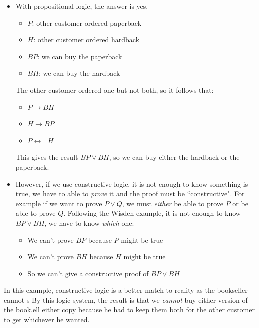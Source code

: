 \documentclass{article}
\begin{document}
\begin{enumerate}
\begin{figure}[H]
\end{figure}
\begin{itemize}
\item With propositional logic, the answer is yes.
\begin{itemize}
\item $P$: other customer ordered paperback
\item $H$: other customer ordered hardback
\item $BP$: we can buy the paperback
\item $BH$: we can buy the hardback
\end{itemize}
The other customer ordered one but not both, so it follows that:
\begin{itemize}
\item $P \rightarrow BH$
\item $H \rightarrow BP$
\item $P \leftrightarrow \neg H$
\end{itemize}
This gives the result $BP \vee BH$, so we can buy either the hardback or the paperback.
\item However, if we use constructive logic, it is not enough to know something is true, we have to able to \textit{prove} it and the proof must be ``constructive". For example if we want to prove $P \vee Q$, we must \textit{either} be able to prove $P$ or be able to prove $Q$. Following the Wisden example, it is not enough to know $BP \vee BH$, we have to know \textit{which} one:
\begin{itemize}
\item We can't prove $BP$ because $P$ might be true
\item We can't prove $BH$ because $H$ might be true
\item So we can't give a constructive proof of $BP \vee BH$
\end{itemize}
\end{itemize}
In this example, constructive logic is a better match to reality as the bookseller cannot s
By this logic system, the result is that we \textit{cannot} buy either version of the book.ell either copy because he had to keep them both for the other customer to get whichever he wanted. 
\end{enumerate}
\end{document}
